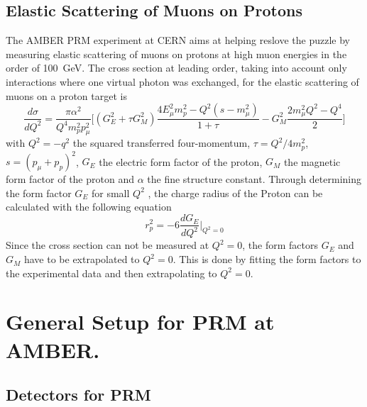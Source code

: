 \subsection{Elastic Scattering of Muons on Protons}
The AMBER PRM experiment at CERN aims at helping reslove the puzzle by measuring elastic scattering of muons on protons at high muon energies in the order of \SI{100} {\giga\electronvolt}.
The cross section at leading order, taking into account only interactions where one virtual photon was exchanged, 
for the elastic scattering of muons on a proton target is 
\begin{equation}
\label{eq:cross_section}
\frac{d\sigma}{dQ^2} = \frac{\pi \alpha^2}{Q^4 m_p^2 p_\mu^2} \bigg[ \left( G_E^2 + \tau G_M^2 \right) \frac{ 4E_\mu^2 m_p^2 
- Q^2 (s - m_\mu^2)}{1 + \tau }  - G_M^2 \frac{ 2m_\mu^2 Q^2 - Q^4}{2} \bigg]
\end{equation}
with  $Q^2 = -q^2$ 	the squared transferred four-momentum, $\tau = Q^2 / 4m_p^2$, $s = (p_\mu + p_p)^2$, 
 $G_E$ the electric form factor of the proton,
  $G_M$ the magnetic form factor of the proton and $\alpha$ the fine structure constant\autocite{intentAmber}.
Through determining the form factor $G_E$ for small $Q^2$ , the charge radius of the Proton can be calculated with the following equation\autocite{intentAmber}
\begin{equation}
\label{eq:charge_radius}
r_p^2 = -6 \frac{dG_E}{dQ^2} \bigg|_{Q^2 = 0}
\end{equation}
Since the cross section can not be measured at $Q^2 = 0$, the form factors $G_E$ and $G_M$ have to be extrapolated to $Q^2 = 0$.
This is done by fitting the form factors to the experimental data and then extrapolating to $Q^2 = 0$\autocite{intentAmber}.
\section{General Setup for PRM at AMBER.}\label{sec:general_setup}
\subsection{Detectors for PRM}

